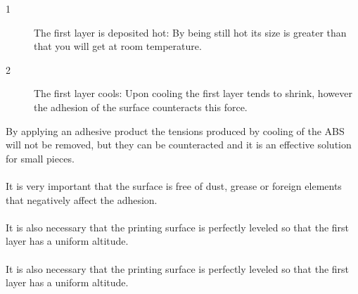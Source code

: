 \documentclass[11pt,a4paper]{article}
\begin{document}
\begin{description}
\item[1] The first layer is deposited hot: By being still hot its size is greater than that you will get at room temperature.
\item[2] The first layer cools: Upon cooling the first layer tends to shrink, however the adhesion of the surface counteracts this force.
\end{description}
By applying an adhesive product the tensions produced by cooling of the ABS will not be removed, but they can be counteracted and it is an effective solution for small pieces.
\\\\
It is very important that the surface is free of dust, grease or foreign elements that negatively affect the adhesion.
\\\\
It is also necessary that the printing surface is perfectly leveled so that the first layer has a uniform altitude.
\\\\
It is also necessary that the printing surface is perfectly leveled so that the first layer has a uniform altitude.
\end{document}
